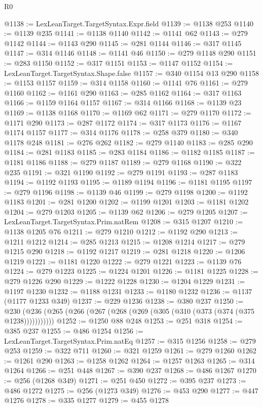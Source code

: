 \begin{lexlean}{R0}
\begin{coremodule}
@1138 := LexLeanTarget.TargetSyntax.Expr.field
@1139 := @1138 @253
@1140 := @1139 @235
@1141 := @1138 @1140
@1142 := @1141 @62
@1143 := @279 @1142
@1144 := @1143 @290
@1145 := @281 @1144
@1146 := @317 @1145
@1147 := @314 @1146
@1148 := @1141 @46
@1150 := @279 @1148 @290
@1151 := @283 @1150
@1152 := @317 @1151
@1153 := @1147 @1152
@1154 := LexLeanTarget.TargetSyntax.Shape.false
@1157 := @340 @1154 @13 @290
@1158 := @1153 @1157
@1159 := @314 @1158
@1160 := @1141 @76
@1161 := @279 @1160
@1162 := @1161 @290
@1163 := @285 @1162
@1164 := @317 @1163
@1166 := @1159 @1164 @1157
@1167 := @314 @1166
@1168 := @1139 @23
@1169 := @1138 @1168
@1170 := @1169 @62
@1171 := @279 @1170
@1172 := @1171 @290
@1173 := @287 @1172
@1174 := @317 @1173
@1176 := @1167 @1174 @1157
@1177 := @314 @1176
@1178 := @258 @379
@1180 := @340 @1178 @248
@1181 := @276 @262
@1182 := @279 @1140
@1183 := @285 @290
@1184 := @281 @1183
@1185 := @283 @1184
@1186 := @1182 @1185
@1187 := @1181 @1186
@1188 := @279 @1187
@1189 := @279 @1168
@1190 := @322 @235
@1191 := @321 @1190
@1192 := @279 @1191
@1193 := @287 @1183
@1194 := @1192 @1193
@1195 := @1189 @1194
@1196 := @1181 @1195
@1197 := @279 @1196
@1198 := @1139 @46
@1199 := @279 @1198
@1200 := @1192 @1183
@1201 := @281 @1200
@1202 := @1199 @1201
@1203 := @1181 @1202
@1204 := @279 @1203
@1205 := @1139 @62
@1206 := @279 @1205
@1207 := LexLeanTarget.TargetSyntax.Prim.natRem
@1208 := @315 @1207
@1210 := @1138 @1205 @76
@1211 := @279 @1210
@1212 := @1192 @290
@1213 := @1211 @1212
@1214 := @285 @1213
@1215 := @1208 @1214
@1217 := @279 @1215 @290
@1218 := @1192 @1217
@1219 := @281 @1218
@1220 := @1206 @1219
@1221 := @1181 @1220
@1222 := @279 @1221
@1223 := @1139 @76
@1224 := @279 @1223
@1225 := @1224 @1201
@1226 := @1181 @1225
@1228 := @279 @1226 @290
@1229 := @1222 @1228
@1230 := @1204 @1229
@1231 := @1197 @1230
@1232 := @1188 @1231
@1233 := @1180 @1232
@1236 := @1137 (@1177 @1233 @349)
@1237 := @229 @1236
@1238 := @380 @237
@1250 := @230 (@236 (@265 (@266 (@267 (@268 (@269 (@305 (@310 (@373 (@374 (@375 @1238)))))))))))
@1252 := @1250 @88 @248
@1253 := @251 @318
@1254 := @385 @237
@1255 := @486 @1254
@1256 := LexLeanTarget.TargetSyntax.Prim.natEq
@1257 := @315 @1256
@1258 := @279 @253
@1259 := @322 @711
@1260 := @321 @1259
@1261 := @279 @1260
@1262 := @1261 @290
@1263 := @1258 @1262
@1264 := @1257 @1263
@1265 := @314 @1264
@1266 := @251 @448
@1267 := @390 @237
@1268 := @486 @1267
@1270 := @256 (@1268 @349)
@1271 := @251 @450
@1272 := @395 @237
@1273 := @486 @1272
@1275 := @256 (@1273 @349)
@1276 := @453 @290
@1277 := @447 @1276
@1278 := @335 @1277
@1279 := @455 @1278

\end{coremodule}
\end{lexlean}
